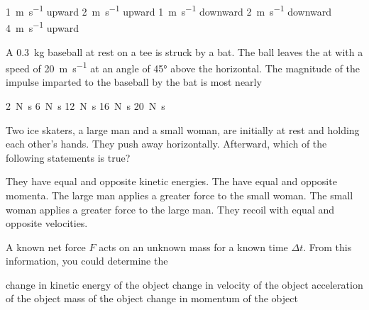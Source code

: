 \documentclass{../../../oss-ap12ibhl}
\begin{document}
\begin{questions}
  \begin{minipage}{.4\linewidth}
  \end{minipage}
  \begin{minipage}{.4\linewidth}
    \begin{choices}
      \choice \SI{1}{\metre\per\second} upward
      \choice \SI{2}{\metre\per\second} upward
      \choice \SI{1}{\metre\per\second} downward
      \choice \SI{2}{\metre\per\second} downward
    \choice \SI{4}{\metre\per\second} upward
    \end{choices}
  \end{minipage}
  \newpage
  
  \question A \SI{.3}{\kilo\gram} baseball at rest on a tee is struck by a bat.
  The ball leaves the at with a speed of \SI{20}{\metre\per\second} at an angle
  of \ang{45} above the horizontal. The magnitude of the impulse imparted to
  the baseball by the bat is most nearly
  \begin{choices}
    \choice\SI{2}{\newton\second}
    \choice\SI{6}{\newton\second}
    \choice\SI{12}{\newton\second}
    \choice\SI{16}{\newton\second}
    \choice\SI{20}{\newton\second}
  \end{choices}

  \question Two ice skaters, a large man and a small woman, are initially at
  rest and holding each other's hands. They push away horizontally. Afterward,
  which of the following statements is true?
  \begin{choices}
    \choice They have equal and opposite kinetic energies.
    \choice The have equal and opposite momenta.
    \choice The large man applies a greater force to the small woman.
    \choice The small woman applies a greater force to the large man.
    \choice They recoil with equal and opposite velocities.
  \end{choices}

  \question A known net force $F$ acts on an unknown mass for a known time
  $\Delta t$. From this information, you could determine the
  \begin{choices}
    \choice change in kinetic energy of the object
    \choice change in velocity of the object
    \choice acceleration of the object
    \choice mass of the object
    \choice change in momentum of the object
  \end{choices}


\end{questions}
\end{document}
